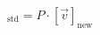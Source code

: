 \documentclass[preview]{standalone}
\begin{document}
\begin{align*}
[\vec{v}]_{\text{std}} = P \cdot [\vec{v}]_{\text{new}}
\end{align*}
\end{document}
